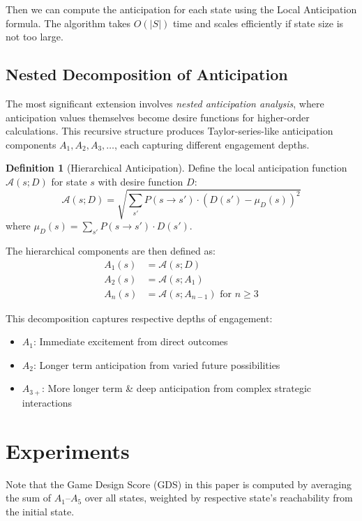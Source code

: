 \documentclass[manuscript,review,anonymous]{acmart}
\theoremstyle{definition}
\newtheorem{definition}{Definition}
\theoremstyle{plain}
\begin{document}
Then we can compute the anticipation for each state using the Local Anticipation formula.
The algorithm takes $O(|S|)$ time and scales efficiently if state size is not too large.

\subsection{Nested Decomposition of Anticipation}
The most significant extension involves \emph{nested anticipation analysis}, where anticipation values themselves become desire functions for higher-order calculations.
This recursive structure produces Taylor-series-like anticipation components $A_1, A_2, A_3, \ldots$, each capturing different engagement depths.

\begin{definition}[Hierarchical Anticipation]
  Define the local anticipation function $\mathcal{A}(s; D)$ for state $s$ with desire function $D$:
  \begin{equation}
    \mathcal{A}(s; D) = \sqrt{\sum_{s'} P(s \to s') \cdot (D(s') - \mu_D(s))^2}
  \end{equation}
  where $\mu_D(s) = \sum_{s'} P(s \to s') \cdot D(s')$.

  The hierarchical components are then defined as:
  \begin{align}
    A_1(s) &= \mathcal{A}(s; D) \\
    A_2(s) &= \mathcal{A}(s; A_1) \\
    A_n(s) &= \mathcal{A}(s; A_{n-1}) \text{ for } n \geq 3
  \end{align}
\end{definition}

This decomposition captures respective depths of engagement:
\begin{itemize}
  \item $A_1$: Immediate excitement from direct outcomes
  \item $A_2$: Longer term anticipation from varied future possibilities
  \item $A_{3+}$: More longer term \& deep anticipation from complex strategic interactions
\end{itemize}

\section{Experiments}
Note that the Game Design Score (GDS) in this paper is computed by averaging the sum of $A_1$--$A_5$ over all states, weighted by respective state's reachability from the initial state.
\end{document}
